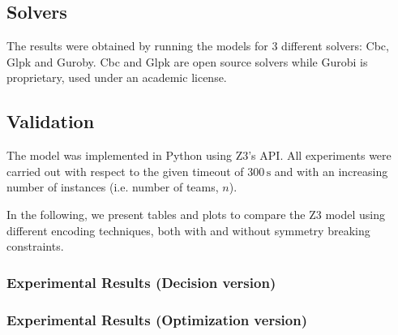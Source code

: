 \subsection{Solvers}
The results were obtained by running the models for 3 different solvers: Cbc, Glpk and Guroby. Cbc and Glpk are open source solvers while Gurobi is proprietary, used under an academic license.

\subsection{Validation}
The model was implemented in Python using Z3's API. All experiments were carried out with respect to the given timeout of $300\,\mathrm{s}$ and with an increasing number of instances (i.e. number of teams, $n$).

In the following, we present tables and plots to compare the Z3 model using different encoding techniques, both with and without symmetry breaking constraints.

\subsubsection{Experimental Results (Decision version)}

\subsubsection{Experimental Results (Optimization version)}

